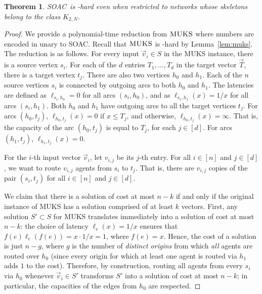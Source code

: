 \documentclass[letterpaper]{article} %
\newtheorem{theorem}{Theorem}
\newcommand{\problem}{{\sc SOAC}\xspace} %
\begin{document}
\begin{theorem}
\label{hard-vc}
\problem\ is \NP-hard even when restricted to networks whose skeletons belong to the class $K_{2,N}$.
\end{theorem} 


\begin{proof}
We provide a polynomial-time reduction from $\textsc{MUKS}$ where numbers are encoded in unary to \problem. Recall that $\textsc{MUKS}$ is \NP-hard by Lemma~\ref{lem:muks}. The reduction is as follows.
For every input $\vec v_i \in S$ in the MUKS instance, there is a source vertex $s_i$.
For each of the $d$ entries $T_1,\ldots,T_d$ in the target vector $\vec{T}$, there is a target vertex $t_j$.
There are also two vertices $h_0$ and $h_1$.
Each of the $n$ source vertices $s_i$ is connected by outgoing arcs to both $h_0$ and $h_1$.
The latencies are defined as $\ell_{s_i,h_0} = 0$ for all arcs $(s_i,h_0)$, and as $\ell_{s_i,h_1}(x) = 1/x$ for all arcs $(s_i, h_1)$.
Both $h_0$ and $h_1$ have outgoing arcs to all the target vertices $t_j$. For arcs $(h_0,t_j)$,
$\ell_{h_0,t_j}(x) = 0$ if $x \leq T_j$, and otherwise, $\ell_{h_0,t_j}(x) = \infty$.
That is, the capacity of the arc $(h_0, t_j)$ is equal to $T_j$, for each $j\in [d]$.
For arcs $(h_1,t_j)$, $\ell_{h_1,t_j}(x) = 0$.

For the $i$-th input vector $\vec{v}_i$, let $v_{i,j}$ be its $j$-th entry. 
For all $i\in [n]$ and $j\in [d]$, 
we want to route $v_{i,j}$ agents from $s_i$ to $t_j$.
That is, there are $v_{i,j}$ copies of the pair $(s_i, t_j)$ for all $i\in [n]$ and $j\in [d]$. 

We claim that there is a solution of cost at most $n-k$ if and only if the original instance of \textsc{MUKS} has a solution comprised of at least $k$ vectors. First, any solution $S'\subset S$ for \textsc{MUKS} translates immediately into a solution of cost at most $n-k$:
the choice of latency $\ell_e(x) = 1/x$ ensures that $f(e) \ell_e(f(e)) = x \cdot 1/x = 1$, where $f(e) = x$. 
Hence, the cost of a solution is just $n-g$, where $g$ is the number of \emph{distinct origins} from which \emph{all} agents are routed over $h_0$ (since every origin for which at least one agent is routed via $h_1$ adds $1$ to the cost).
Therefore, by construction, routing all agents from every $s_i$ via $h_0$ whenever $\vec v_i \in S'$ transforms $S'$ into a solution of cost at most $n-k$; in particular, the capacities of the edges from $h_0$ are respected.


\end{proof}
\end{document}
